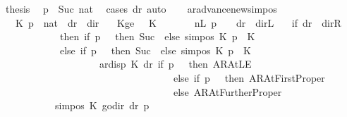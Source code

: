 \begin{isabellebody}
\ {\isacharquery}{\kern0pt}thesis\ \isamarkupfalse%
\ {\isacartoucheopen}p\ {\isacharequal}{\kern0pt}\ Suc\ nat{\isacartoucheclose}\ \isamarkupfalse%
\ {\isacharparenleft}{\kern0pt}cases\ dr{\isacharparenright}{\kern0pt}\ auto\isanewline
\ \ \isamarkupfalse%
\isanewline
{}\isamarkupfalse%
%
\endisatagproof
{\isafoldproof}%
%
\isadelimproof
\isanewline
%
\endisadelimproof
\isanewline
{}\isamarkupfalse%
\ ar{\isacharunderscore}{\kern0pt}advance{\isacharunderscore}{\kern0pt}newsimpos{\isacharcolon}{\kern0pt}\isanewline
\ \ \ K\ p\ {\isacharcolon}{\kern0pt}{\isacharcolon}{\kern0pt}\ nat\ \ dr\ {\isacharcolon}{\kern0pt}{\isacharcolon}{\kern0pt}\ dir\isanewline
\ \ \ Kge{}{\isacharcolon}{\kern0pt}\ {\isachardoublequoteopen}{}\ {\isasymle}\ K{\isachardoublequoteclose}\isanewline
\ \ \ \ \ \ \ nL{}{\isacharcolon}{\kern0pt}\ {\isachardoublequoteopen}p\ {\isacharequal}{\kern0pt}\ {}\ {\isasymLongrightarrow}\ dr\ {\isasymnoteq}\ dir{\isachardot}{\kern0pt}L{\isachardoublequoteclose}\isanewline
\ \ \ {\isachardoublequoteopen}{\isacharparenleft}{\kern0pt}if\ dr\ {\isacharequal}{\kern0pt}\ dir{\isachardot}{\kern0pt}R\isanewline
\ \ \ \ \ \ \ \ \ \ \ \ then\ {\isacharparenleft}{\kern0pt}if\ p\ {\isacharequal}{\kern0pt}\ {}\ then\ Suc\ {}\ else\ sim{\isacharunderscore}{\kern0pt}pos\ K\ p\ {\isacharplus}{\kern0pt}\ K{\isacharparenright}{\kern0pt}\isanewline
\ \ \ \ \ \ \ \ \ \ \ \ else\ {\isacharparenleft}{\kern0pt}if\ p\ {\isacharequal}{\kern0pt}\ {}\ then\ Suc\ {}\ else\ sim{\isacharunderscore}{\kern0pt}pos\ K\ p\ {\isacharplus}{\kern0pt}\ K{\isacharparenright}{\kern0pt}\isanewline
\ \ \ \ \ \ \ \ \ \ \ \ \ \ \ \ \ \ \ {\isacharminus}{\kern0pt}\ ar{\isacharunderscore}{\kern0pt}disp\ K\ dr\ {\isacharparenleft}{\kern0pt}if\ p\ {\isacharequal}{\kern0pt}\ {}\ then\ AR{\isacharunderscore}{\kern0pt}AtLE\isanewline
\ \ \ \ \ \ \ \ \ \ \ \ \ \ \ \ \ \ \ \ \ \ \ \ \ \ \ \ \ \ \ \ \ \ \ else\ if\ p\ {\isacharequal}{\kern0pt}\ {}\ then\ AR{\isacharunderscore}{\kern0pt}AtFirstProper\isanewline
\ \ \ \ \ \ \ \ \ \ \ \ \ \ \ \ \ \ \ \ \ \ \ \ \ \ \ \ \ \ \ \ \ \ \ else\ AR{\isacharunderscore}{\kern0pt}AtFurtherProper{\isacharparenright}{\kern0pt}{\isacharparenright}{\kern0pt}\isanewline
\ \ \ \ \ \ \ \ \ \ {\isacharequal}{\kern0pt}\ sim{\isacharunderscore}{\kern0pt}pos\ K\ {\isacharparenleft}{\kern0pt}go{\isacharunderscore}{\kern0pt}dir\ dr\ p{\isacharparenright}{\kern0pt}{\isachardoublequoteclose}\isanewline

\end{isabellebody}
